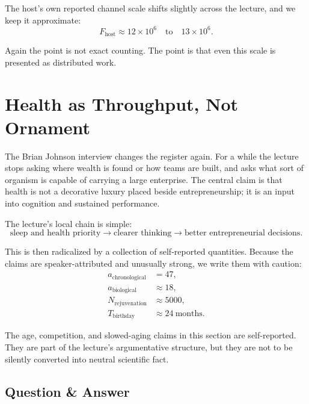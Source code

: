 The host's own reported channel scale shifts slightly across the lecture, and we keep it approximate:
\begin{equation}
F_{\mathrm{host}} \approx 12\times 10^{6}
\quad\text{to}\quad
13\times 10^{6}.
\end{equation}

Again the point is not exact counting. The point is that even this scale is presented as distributed work.

\section{Health as Throughput, Not Ornament}

The Brian Johnson interview changes the register again. For a while the lecture stops asking where wealth is found or how teams are built, and asks what sort of organism is capable of carrying a large enterprise. The central claim is that health is not a decorative luxury placed beside entrepreneurship; it is an input into cognition and sustained performance.

The lecture's local chain is simple:
\begin{equation}
\text{sleep and health priority}
\to
\text{clearer thinking}
\to
\text{better entrepreneurial decisions}.
\end{equation}

This is then radicalized by a collection of self-reported quantities. Because the claims are speaker-attributed and unusually strong, we write them with caution:
\begin{align}
a_{\mathrm{chronological}} &= 47,\\
a_{\mathrm{biological}} &\approx 18,\\
N_{\mathrm{rejuvenation}} &\approx 5000,\\
T_{\mathrm{birthday}} &\approx 24\ \text{months}.
\end{align}

\begin{remark}
The age, competition, and slowed-aging claims in this section are self-reported. They are part of the lecture's argumentative structure, but they are not to be silently converted into neutral scientific fact.
\end{remark}

\subsection{Question \& Answer}

